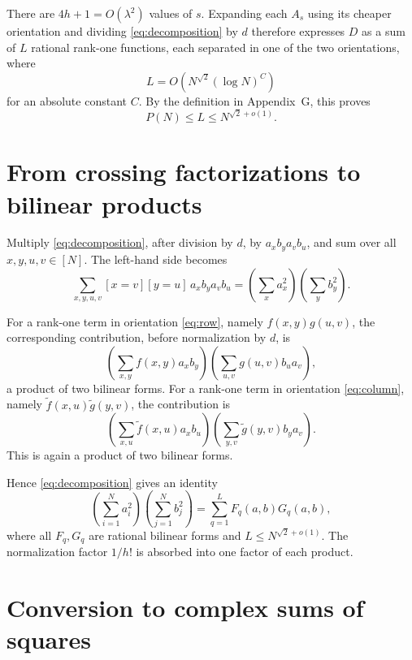 \documentclass[11pt,a4paper]{article}
\begin{document}
There are \(4h+1=O(\lambda^2)\) values of \(s\). Expanding each \(A_s\)
using its cheaper orientation and dividing \eqref{eq:decomposition} by
\(d\) therefore expresses \(D\) as a sum of \(L\) rational rank-one
functions, each separated in one of the two orientations, where
\begin{equation}
  L=O\!\left(N^{\sqrt{2}}(\log N)^C\right)
  \label{eq:length}
\end{equation}
for an absolute constant \(C\). By the definition in Appendix~G, this proves
\begin{equation}
  P(N)\leq L\leq N^{\sqrt{2}+o(1)}.
  \label{eq:crossing-bound}
\end{equation}

\section{From crossing factorizations to bilinear products}

Multiply \eqref{eq:decomposition}, after division by \(d\), by
\(a_xb_ya_vb_u\), and sum over all \(x,y,u,v\in[N]\). The left-hand side
becomes
\begin{equation}
  \sum_{x,y,u,v}[x=v][y=u]\,a_xb_ya_vb_u
  =\left(\sum_xa_x^2\right)\left(\sum_yb_y^2\right).
  \label{eq:contraction}
\end{equation}

For a rank-one term in orientation \eqref{eq:row}, namely
\(f(x,y)g(u,v)\), the corresponding contribution, before normalization by
\(d\), is
\[
  \left(\sum_{x,y}f(x,y)a_xb_y\right)
  \left(\sum_{u,v}g(u,v)b_ua_v\right),
\]
a product of two bilinear forms. For a rank-one term in orientation
\eqref{eq:column}, namely
\(\widetilde f(x,u)\widetilde g(y,v)\), the contribution is
\[
  \left(\sum_{x,u}\widetilde f(x,u)a_xb_u\right)
  \left(\sum_{y,v}\widetilde g(y,v)b_ya_v\right).
\]
This is again a product of two bilinear forms.

Hence \eqref{eq:decomposition} gives an identity
\begin{equation}
  \boxed{
  \left(\sum_{i=1}^{N}a_i^2\right)
  \left(\sum_{j=1}^{N}b_j^2\right)
  =\sum_{q=1}^{L}F_q(a,b)G_q(a,b),
  }
  \label{eq:products}
\end{equation}
where all \(F_q,G_q\) are rational bilinear forms and
\(L\leq N^{\sqrt{2}+o(1)}\). The normalization factor \(1/h!\) is absorbed
into one factor of each product.

\section{Conversion to complex sums of squares}
\end{document}
